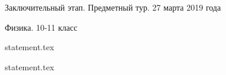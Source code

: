 \documentclass[a4paper,11pt, oneside]{book}
\begin{document}
\vspace{-3mm}
\vspace{-5mm}

\normalsize

\begin{center}
    Заключительный этап. Предметный тур. 27 марта 2019 года
    
    Физика. 10-11 класс
\end{center}

\parindent=0cm

{statement.tex}

\newpage

{statement.tex}
\end{document}
